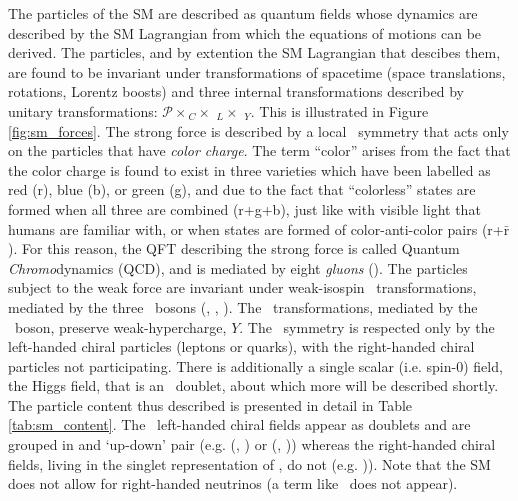 The particles of the SM are described as quantum fields whose dynamics are
described by the SM Lagrangian from which the equations of motions can be derived.
The particles, and by extention the SM Lagrangian that descibes them, are found to be invariant under transformations of spacetime 
(space translations, rotations, Lorentz boosts) and three internal transformations described by unitary transformations: $\mathcal{P} \times$\SUthree$_C \times $ \SUtwo$_L \times$ \Uone$_{Y}$.
This is illustrated in Figure \ref{fig:sm_forces}. The strong force is described by a
local \SUthree~symmetry that acts only on the particles that have \textit{color charge}.
The term ``color'' arises from the fact that the color charge is found to exist
in three varieties which have been labelled as red (r), blue (b), or green (g), and due
to the fact that ``colorless'' states are formed when all three are combined (r+g+b), just
like with visible light that humans are familiar with, or when states are formed of color-anti-color
pairs (r+$\bar{\text{r}}$). For this reason, the QFT describing the strong force is called
Quantum \textit{Chromo}dynamics (QCD), and is mediated by eight \textit{gluons} (\fieldG).
The particles subject to the weak force are invariant under weak-isospin \SUtwo~transformations,
mediated by the three  \fieldW~bosons (\fieldWone, \fieldWtwo, \fieldWthree).
The \Uone~transformations, mediated by the \fieldB~boson, preserve weak-hypercharge, $Y$.
The \SUtwo~symmetry is respected only by the left-handed chiral
particles (leptons or quarks), with the right-handed chiral particles not participating.
There is additionally a single scalar (i.e. spin-0) field, the Higgs field, that is an \SUtwo~doublet, about which more will be described shortly.
The particle content thus described is presented in detail in Table \ref{tab:sm_content}.
The \SUtwo~left-handed chiral fields appear as doublets and are grouped in
and `up-down' pair (e.g. (\fieldUl, \fieldDl) or (\fieldEl, \fieldNuEl)) whereas the right-handed chiral fields,
living in the singlet representation of \SUtwo, do not (e.g. \fieldUr)). Note
that the SM does not allow for right-handed neutrinos (a term like \fieldNuR~does not appear).

